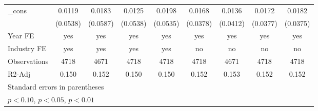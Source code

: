 \begin{table}[htbp]
\begin{tabular}{l*{8}{c}}
\_cons              &      0.0119         &      0.0183         &      0.0125         &      0.0198         &      0.0168         &      0.0136         &      0.0172         &      0.0182         \\
                    &    (0.0538)         &    (0.0587)         &    (0.0538)         &    (0.0535)         &    (0.0378)         &    (0.0412)         &    (0.0377)         &    (0.0375)         \\
\hline
Year FE             &         yes         &         yes         &         yes         &         yes         &         yes         &         yes         &         yes         &         yes         \\
Industry FE         &         yes         &         yes         &         yes         &         yes         &          no         &          no         &          no         &          no         \\
Observations        &        4718         &        4671         &        4718         &        4718         &        4718         &        4671         &        4718         &        4718         \\
R2-Adj              &       0.150         &       0.152         &       0.150         &       0.150         &       0.152         &       0.153         &       0.152         &       0.152         \\
\hline\hline
\multicolumn{9}{l}{\footnotesize Standard errors in parentheses}\\
\multicolumn{9}{l}{\footnotesize \sym{*} \(p<0.10\), \sym{**} \(p<0.05\), \sym{***} \(p<0.01\)}\\
\end{tabular}
\end{table}

